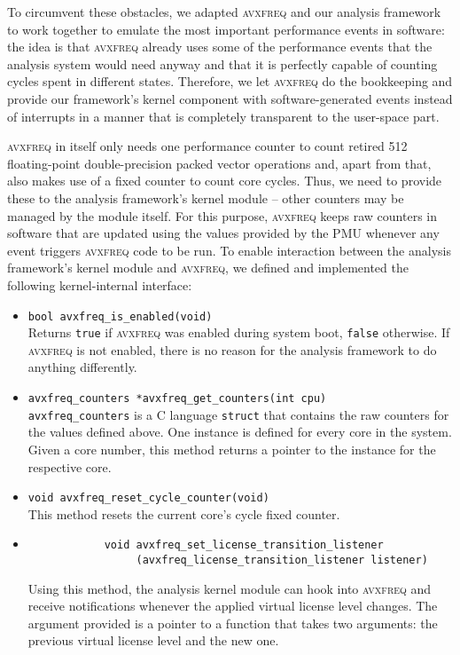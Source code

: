 To circumvent these obstacles, we adapted \textsc{avxfreq} and our analysis framework to work together to emulate the most important performance events in software: the idea is that \textsc{avxfreq} already uses some of the performance events that the analysis system would need anyway and that it is perfectly capable of counting cycles spent in different states. Therefore, we let \textsc{avxfreq} do the bookkeeping and provide our framework's kernel component with software-generated events instead of interrupts in a manner that is completely transparent to the user-space part.

\textsc{avxfreq} in itself only needs one performance counter to count retired \SI{512}{\bit} floating-point double-precision packed vector operations and, apart from that, also makes use of a fixed counter to count core cycles. Thus, we need to provide these to the analysis framework's kernel module -- other counters may be managed by the module itself. For this purpose, \textsc{avxfreq} keeps raw counters in software that are updated using the values provided by the \gls{PMU} whenever any event triggers \textsc{avxfreq} code to be run. To enable interaction between the analysis framework's kernel module and \textsc{avxfreq}, we defined and implemented the following kernel-internal interface:

\begin{itemize}
	\item \texttt{bool avxfreq_is_enabled(void)} \\
		Returns \texttt{true} if \textsc{avxfreq} was enabled during system boot, \texttt{false} otherwise. If \textsc{avxfreq} is not enabled, there is no reason for the analysis framework to do anything differently.
	\item \texttt{avxfreq_counters *avxfreq_get_counters(int cpu)} \\
		\texttt{avxfreq_counters} is a C language \texttt{struct} that contains the raw counters for the values defined above. One instance is defined for every core in the system. Given a core number, this method returns a pointer to the instance for the respective core.
	\item \texttt{void avxfreq_reset_cycle_counter(void)} \\
		This method resets the current core's cycle fixed counter. %
	\item \begin{verbatim}
			void avxfreq_set_license_transition_listener
			     (avxfreq_license_transition_listener listener)
		\end{verbatim}
		\vspace{-0.45cm} %
		Using this method, the analysis kernel module can hook into \textsc{avxfreq} and receive notifications whenever the applied virtual license level changes. The argument provided is a pointer to a function that takes two arguments: the previous virtual license level and the new one.
\end{itemize}

